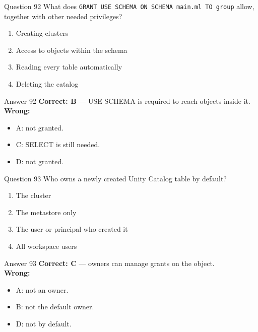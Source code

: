 \documentclass[aspectratio=169,11pt]{beamer}
\begin{document}
\begin{frame}{Question 92}
What does \texttt{GRANT USE SCHEMA ON SCHEMA main.ml TO group} allow, together with other needed privileges?
\begin{enumerate}[label=\Alph*.]
\item Creating clusters
\item Access to objects within the schema
\item Reading every table automatically
\item Deleting the catalog
\end{enumerate}
\end{frame}
\begin{frame}{Answer 92}
\textbf{Correct: B} --- USE SCHEMA is required to reach objects inside it.\\
\vspace{0.5em}
\textbf{Wrong:}
\begin{itemize}
\item A: not granted.
\item C: SELECT is still needed.
\item D: not granted.
\end{itemize}
\end{frame}

\begin{frame}{Question 93}
Who owns a newly created Unity Catalog table by default?
\begin{enumerate}[label=\Alph*.]
\item The cluster
\item The metastore only
\item The user or principal who created it
\item All workspace users
\end{enumerate}
\end{frame}
\begin{frame}{Answer 93}
\textbf{Correct: C} --- owners can manage grants on the object.\\
\vspace{0.5em}
\textbf{Wrong:}
\begin{itemize}
\item A: not an owner.
\item B: not the default owner.
\item D: not by default.
\end{itemize}
\end{frame}
\end{document}
